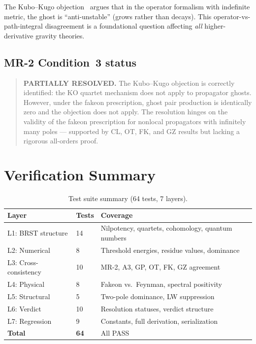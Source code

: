 \documentclass[11pt,a4paper]{article}
\begin{document}
The Kubo--Kugo objection~\cite{KuboKugo2023} argues that in the
operator formalism with indefinite metric, the ghost is
``anti-unstable'' (grows rather than decays).  This
operator-vs-path-integral disagreement is a foundational question
affecting \emph{all} higher-derivative gravity theories.

\subsection{MR-2 Condition~3 status}

\begin{quote}
\textbf{PARTIALLY RESOLVED.}  The Kubo--Kugo objection is correctly
identified: the KO quartet mechanism does not apply to propagator
ghosts.  However, under the fakeon prescription, ghost pair production
is identically zero and the objection does not apply.  The resolution
hinges on the validity of the fakeon prescription for nonlocal
propagators with infinitely many poles --- supported by CL, OT, FK,
and GZ results but lacking a rigorous all-orders proof.
\end{quote}


\section{Verification Summary}
\label{sec:verification}

\begin{table}[htb]
\centering
\caption{Test suite summary (64 tests, 7 layers).}
\label{tab:tests}
\begin{tabular}{lll}
\toprule
Layer & Tests & Coverage \\
\midrule
L1: BRST structure & 14 & Nilpotency, quartets, cohomology, quantum numbers \\
L2: Numerical & 8 & Threshold energies, residue values, dominance \\
L3: Cross-consistency & 10 & MR-2, A3, GP, OT, FK, GZ agreement \\
L4: Physical & 8 & Fakeon vs.\ Feynman, spectral positivity \\
L5: Structural & 5 & Two-pole dominance, LW suppression \\
L6: Verdict & 10 & Resolution statuses, verdict structure \\
L7: Regression & 9 & Constants, full derivation, serialization \\
\midrule
\textbf{Total} & \textbf{64} & All PASS \\
\bottomrule
\end{tabular}
\end{table}
\end{document}
